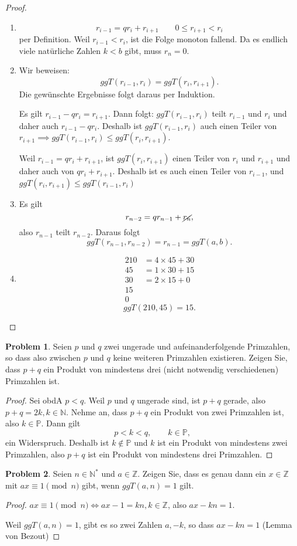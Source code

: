 \documentclass[prb,12pt]{revtex4-2}
\theoremstyle{definition}
\newtheorem{Problem}{Problem}
\theoremstyle{definition}
\newenvironment{parts}{\begin{enumerate}[label=(\alph*)]}{\end{enumerate}}
\newcommand{\N}{\mathbb{N}}
\newcommand{\Z}{\mathbb{Z}}
\begin{document}
\begin{proof}
	\begin{parts}
	\item

		\[r_{i-1}=qr_{i}+r_{i+1}\qquad 0\le r_{i+1}<r_i\]
		per Definition. Weil $r_{i-1}<r_i$, ist die Folge monoton fallend. Da es endlich viele nat\"{u}rliche Zahlen $k<b$ gibt, muss $r_n=0$.
 

	\item Wir beweisen:
		\[
			ggT(r_{i-1}, r_i)=ggT(r_i,r_{i+1})
		.\]
		Die gewünschte Ergebnisse folgt daraus per Induktion.

		Es gilt $r_{i-1}-qr_i=r_{i+1}$. Dann folgt: $ggT(r_{i-1}, r_i)$ teilt $r_{i-1}$ und $r_i$ und daher auch $r_{i-1}-qr_i$. Deshalb ist $ggT(r_{i-1},r_i)$ auch einen Teiler von $r_{i+1}\implies ggT(r_{i-1},r_i)\le ggT(r_i, r_{i+1})$. 

		Weil $r_{i-1}=qr_i+r_{i+1}$, ist $ggT(r_i,r_{i+1})$ einen Teiler von $r_i$ und $r_{i+1}$ und daher auch von $qr_i+r_{i+1}$. Deshalb ist es auch einen Teiler von $r_{i-1}$, und $ggT(r_{i},r_{i+1})\le ggT(r_{i-1},r_i)$
	\item Es gilt
		\[
			r_{n-2}=qr_{n-1}+\cancel{r_{n}}
		,\] 
		also $r_{n-1}$ teilt $r_{n-2}$. Daraus folgt
		\[
			ggT(r_{n-1},r_{n-2})=r_{n-1}=ggT(a,b)
		.\] 
	\item 
		\begin{align*}
			210&=4 \times 45+30\\
			45&=1\times 30+15\\
			30&=2\times 15+0\\
			15&\\
			0&
		\end{align*}
		\[
		ggT(210,45)=15
		.\]

	\end{parts}
\end{proof}
\begin{Problem}
	Seien $p$ und $q$ zwei ungerade und aufeinanderfolgende Primzahlen, so dass also zwischen $p$ und $q$ keine weiteren Primzahlen existieren. Zeigen Sie, dass $p + q$ ein Produkt von mindestens drei (nicht notwendig verschiedenen) Primzahlen ist.
\end{Problem}

\begin{proof}
	Sei obdA $p<q$. Weil $p$ und $q$ ungerade sind, ist $p+q$ gerade, also $p+q=2k, k\in \N$. Nehme an, dass $p+q$ ein Produkt von zwei Primzahlen ist, also $k\in \mathbb{P}$. Dann gilt
	\[
		p < k < q, \qquad k\in \mathbb{P}
	,\]
	ein Widerspruch. Deshalb ist $k\not\in \mathbb{P}$ und $k$ ist ein Produkt von mindestens zwei Primzahlen, also $p+q$ ist ein Produkt von mindestens drei Primzahlen. 
\end{proof}

\begin{Problem}
	Seien $n \in \N^*$ und $a \in \Z$. Zeigen Sie, dass es genau dann ein $x \in \Z$ mit $ax \equiv 1\pmod{n}$ gibt, wenn $ggT(a, n) = 1$ gilt.
\end{Problem}
\begin{proof}
	$ax\equiv 1\pmod{n}\iff ax-1=kn, k\in\Z$, also $ax-kn=1$.

	Weil $ggT(a,n)=1$, gibt es so zwei Zahlen $a, -k$, so dass $ax-kn=1$ (Lemma von Bezout)
\end{proof}
\end{document}
